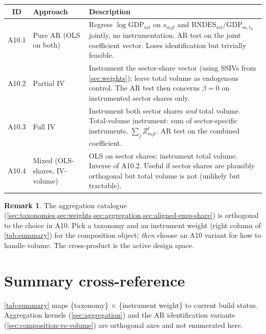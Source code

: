 \documentclass[12pt]{article}
\theoremstyle{definition}
\newtheorem{remark}{Remark}
\begin{document}
\small
\begin{longtable}{@{}c >{\raggedright\arraybackslash}p{}
                    >{\raggedright\arraybackslash}p{}@{}}
\toprule
\textbf{ID} & \textbf{Approach} & \textbf{Description} \\
\midrule
\endhead
A10.1 & Pure AR (OLS on both) & Regress $\log\mathrm{GDP}_{mt}$ on $s_{mjt}$ and $\mathrm{BNDES}_{mt}/\mathrm{GDP}_{m,t_0}$ jointly, no instrumentation. AR test on the joint coefficient vector. Loses identification but trivially feasible. \\
A10.2 & Partial IV & Instrument the sector-share vector (using SSIVs from \cref{sec:weights}); leave total volume as endogenous control. The AR test then concerns $\beta = 0$ on instrumented sector shares only. \\
A10.3 & Full IV & Instrument both sector shares \emph{and} total volume. Total-volume instrument: sum of sector-specific instruments, $\sum_j Z^{\ell}_{mjt}$. AR test on the combined coefficient. \\
A10.4 & Mixed (OLS-shares, IV-volume) & OLS on sector shares; instrument total volume. Inverse of A10.2. Useful if sector shares are plausibly orthogonal but total volume is not (unlikely but tractable). \\
\bottomrule
\end{longtable}
\normalsize

\begin{remark}
The aggregation catalogue (\cref{sec:taxonomies,sec:weights,sec:aggregation,sec:aligned-emp-share}) is orthogonal to the choice in A10. Pick a taxonomy and an instrument weight (right column of \cref{tab:summary}) for the composition object; \emph{then} choose an A10 variant for how to handle volume. The cross-product is the active design space.
\end{remark}

\section{Summary cross-reference}
\label{sec:summary}

\cref{tab:summary} maps \{taxonomy\} $\times$ \{instrument weight\} to current build status. Aggregation kernels (\cref{sec:aggregation}) and the AR identification variants (\cref{sec:composition-vs-volume}) are orthogonal axes and not enumerated here.
\end{document}

